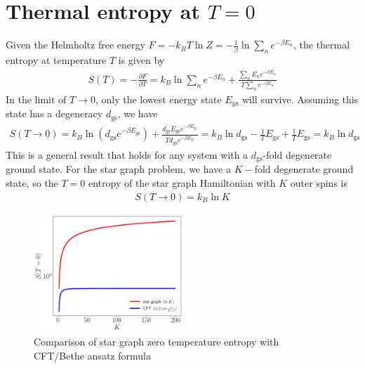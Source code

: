 \documentclass{revtex4-2}
\numberwithin{equation}{section}
\begin{document}
\section{Thermal entropy at \(T=0\)}
Given the Helmholtz free energy \(F = -k_B T \ln Z = - \frac{1}{\beta} \ln\sum_n e^{-\beta E_n}\), the thermal entropy at temperature \(T\) is given by
\begin{equation}\begin{aligned}
	S(T) = - \frac{\partial{F}}{\partial{T}} = k_B \ln\sum_n e^{-\beta E_n} + \frac{\sum_n E_n e^{-\beta E_n}}{T \sum_n e^{-\beta E_n}}
\end{aligned}\end{equation}
In the limit of \(T \to 0\), only the lowest energy state \(E_\text{gs}\) will survive. Assuming this state has a degeneracy \(d_\text{gs}\), we have
\begin{equation}\begin{aligned}
	S(T \to 0) = k_B \ln\left(d_\text{gs} e^{-\beta E_\text{gs}}\right) + \frac{d_\text{gs} E_\text{gs}e^{-\beta E_\text{gs}}}{T d_\text{gs} e^{-\beta E_\text{gs}}} = k_B \ln d_\text{gs} - \frac{1}{T}E_\text{gs} + \frac{1}{T}E_\text{gs} = k_B \ln d_\text{gs}
\end{aligned}\end{equation}
This is a general result that holds for any system with a \(d_\text{gs}\)-fold degenerate ground state. For the star graph problem, we have a \(K-\)fold degenerate ground state, so the \(T=0\) entropy of the star graph Hamiltonian with \(K\) outer spins is
\begin{equation}\begin{aligned}
	S(T\to 0) = k_B \ln K
\end{aligned}\end{equation}

\begin{figure}[!ht]
	\centering
	\includegraphics[width=0.5\textwidth]{../numerics/entropy_comparison.pdf}
	\caption{Comparison of star graph zero temperature entropy with CFT/Bethe ansatz formula}
\end{figure}
\end{document}
